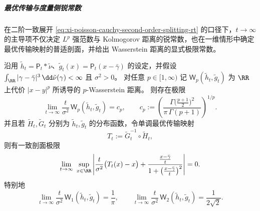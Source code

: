 \subparagraph{最优传输与度量侧锐常数}
在二阶一致展开 \eqref{eq:xi-poisson-cauchy-second-order-splitting-rt} 的口径下，\(t\to\infty\) 的主导项不仅决定 \(L^p\) 强范数与 Kolmogorov 距离的锐常数，也在一维情形中确定最优传输映射的普适剖面，并给出 Wasserstein 距离的显式极限常数。

\begin{theorem}\label{thm:xi-poisson-cauchy-wasserstein-sharp-constant-map-profile}
沿用 \(\tilde h_t=\mathsf P_t*\tilde\nu\)、\(\tilde g_t(x)=\mathsf P_t(x-\bar\gamma)\) 的设定，并假设 \(\int_{\RR}|\gamma-\bar\gamma|^3\,\dd\tilde\nu(\gamma)<\infty\) 且 \(\sigma^2>0\)。
对任意 \(p\in[1,\infty)\) 记 \(\mathsf W_p(\tilde h_t,\tilde g_t)\) 为 \(\RR\) 上代价 \(|x-y|^p\) 所诱导的 \(p\)-Wasserstein 距离。
则存在极限
\[
\lim_{t\to\infty}\frac{t}{\sigma^2}\,\mathsf W_p(\tilde h_t,\tilde g_t)
=c_p,
\qquad
c_p:=\left(\frac{\Gamma\!\bigl(\frac{p+1}{2}\bigr)^2}{\pi\,\Gamma(p+1)}\right)^{1/p}.
\]
并且若 \(\tilde H_t,\tilde G_t\) 分别为 \(\tilde h_t,\tilde g_t\) 的分布函数，令单调最优传输映射
\[
T_t:=\tilde G_t^{-1}\circ \tilde H_t,
\]
则有一致剖面极限
\[
\lim_{t\to\infty}\ \sup_{x\in\RR}\left|
\frac{t}{\sigma^2}\bigl(T_t(x)-x\bigr)
+\frac{\frac{x-\bar\gamma}{t}}{1+\bigl(\frac{x-\bar\gamma}{t}\bigr)^2}
\right|=0.
\]
特别地
\[
\lim_{t\to\infty}\frac{t}{\sigma^2}\,\mathsf W_1(\tilde h_t,\tilde g_t)=\frac{1}{\pi},
\qquad
\lim_{t\to\infty}\frac{t}{\sigma^2}\,\mathsf W_2(\tilde h_t,\tilde g_t)=\frac{1}{2\sqrt2}.
\]
\end{theorem}

